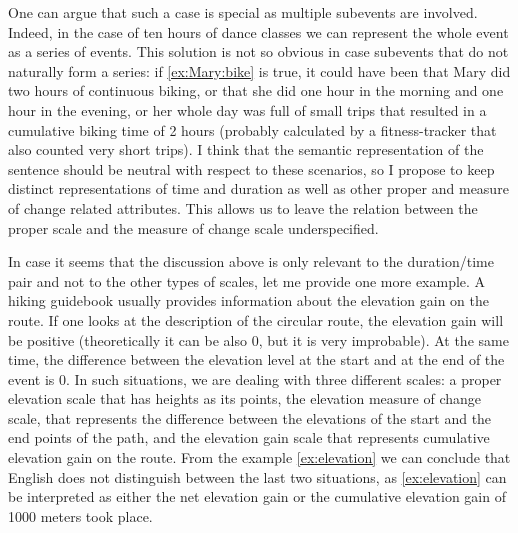 One can argue that such a case is special as multiple subevents are involved. Indeed, in the case of ten hours of dance classes we can represent the whole event as a series of  events. This solution is not so obvious in case subevents that do not naturally form a series: if \ref{ex:Mary:bike} is true, it could have been that Mary did two hours of continuous biking, or that she did one hour in the morning and one hour in the evening, or her whole day was full of small trips that resulted in a cumulative  biking time of 2 hours (probably calculated by a fitness-tracker that also counted very short trips). I think that the semantic representation of the sentence should be neutral with respect to these scenarios, so I propose to keep distinct representations of time and duration as well as other proper and measure of change related attributes. This allows us to leave the relation between the proper scale and the measure of change scale underspecified.

In case it seems that the discussion above is only relevant to the duration/time pair and not to the other types of scales, let me provide one more example. A hiking guidebook usually provides information about the elevation gain on the route. If one looks at the description of the circular route, the elevation gain will be positive (theoretically it can be also 0, but it is very improbable). At the same time, the difference between the elevation level at the start and at the end of the event is 0. In such situations, we are dealing with three different scales: a proper elevation scale that has heights as its points, the elevation measure of change scale, that represents the difference between the elevations of the start and the end points of the path, and the elevation gain scale that represents cumulative  elevation gain on the route. From the example \ref{ex:elevation} we can conclude that English does not distinguish between the last two situations, as \ref{ex:elevation} can be interpreted as either the net elevation gain or the cumulative  elevation gain of 1000 meters took place. 

